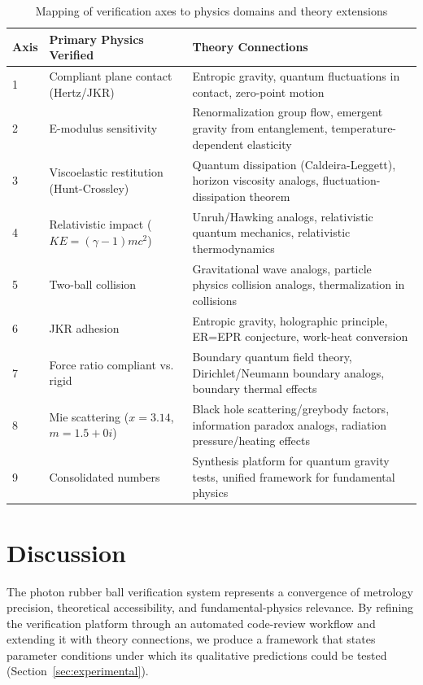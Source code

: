 \documentclass[12pt,twoside]{article}
\begin{document}
\begin{table}[htbp]
\centering
\caption{Mapping of verification axes to physics domains and theory extensions}
\label{tab:axes_mapping}
\begin{tabular}{lp{3.5in}p{2.5in}}
\toprule
Axis & Primary Physics Verified & Theory Connections \\
\midrule
1 & Compliant plane contact (Hertz/JKR) & Entropic gravity, quantum fluctuations in contact, zero-point motion \\
2 & E-modulus sensitivity & Renormalization group flow, emergent gravity from entanglement, temperature-dependent elasticity \\
3 & Viscoelastic restitution (Hunt-Crossley) & Quantum dissipation (Caldeira-Leggett), horizon viscosity analogs, fluctuation-dissipation theorem \\
4 & Relativistic impact ($KE=(\gamma-1)mc^2$) & Unruh/Hawking analogs, relativistic quantum mechanics, relativistic thermodynamics \\
5 & Two-ball collision & Gravitational wave analogs, particle physics collision analogs, thermalization in collisions \\
6 & JKR adhesion & Entropic gravity, holographic principle, ER=EPR conjecture, work-heat conversion \\
7 & Force ratio compliant vs. rigid & Boundary quantum field theory, Dirichlet/Neumann boundary analogs, boundary thermal effects \\
8 & Mie scattering ($x=3.14$, $m=1.5+0i$) & Black hole scattering/greybody factors, information paradox analogs, radiation pressure/heating effects \\
9 & Consolidated numbers & Synthesis platform for quantum gravity tests, unified framework for fundamental physics \\
\bottomrule
\end{tabular}
\end{table}

\section{Discussion}
The photon rubber ball verification system represents a convergence of metrology precision, theoretical accessibility, and fundamental-physics relevance. By refining the verification platform through an automated code-review workflow and extending it with theory connections, we produce a framework that states parameter conditions under which its qualitative predictions could be tested (Section~\ref{sec:experimental}).
\end{document}
